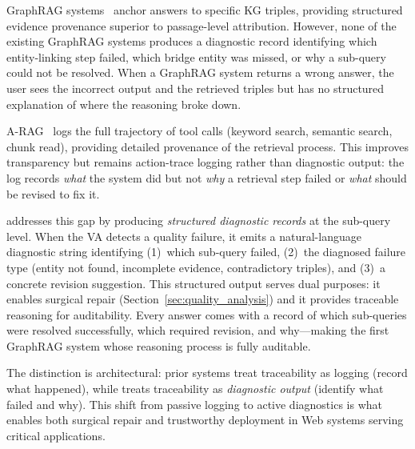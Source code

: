 GraphRAG systems~\cite{edge2024graphrag,guo2024lightrag} anchor answers to
specific KG triples, providing structured evidence provenance superior to
passage-level attribution. However, none of the existing GraphRAG systems
produces a diagnostic record identifying which entity-linking step failed, which
bridge entity was missed, or why a sub-query could not be resolved. When a
GraphRAG system returns a wrong answer, the user sees the incorrect output and
the retrieved triples but has no structured explanation of where the reasoning
broke down.

A-RAG~\cite{arag2026} logs the full trajectory of tool calls (keyword search,
semantic search, chunk read), providing detailed provenance of the retrieval
process. This improves transparency but remains action-trace logging rather than
diagnostic output: the log records \emph{what} the system did but not \emph{why}
a retrieval step failed or \emph{what} should be revised to fix it.

\sys addresses this gap by producing \emph{structured diagnostic records} at the
sub-query level. When the VA detects a quality failure, it emits a natural-language
diagnostic string identifying (1)~which sub-query failed, (2)~the diagnosed
failure type (entity not found, incomplete evidence, contradictory triples), and
(3)~a concrete revision suggestion. This structured output serves dual purposes:
it enables surgical repair (Section~\ref{sec:quality_analysis}) and it provides
traceable reasoning for auditability. Every answer comes with a record of which
sub-queries were resolved successfully, which required revision, and why---making
\sys the first GraphRAG system whose reasoning process is fully auditable.

The distinction is architectural: prior systems treat traceability as logging
(record what happened), while \sys treats traceability as \emph{diagnostic output}
(identify what failed and why). This shift from passive logging to active
diagnostics is what enables both surgical repair and trustworthy deployment in
Web systems serving critical applications.


